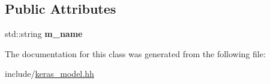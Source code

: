 \subsection*{Public Attributes}
\begin{DoxyCompactItemize}
\item 
\mbox{\label{classkeras_1_1_layer_a07d82395843bef44049586f33fd9e5a1}} 
std\+::string {\bfseries m\+\_\+name}
\end{DoxyCompactItemize}


The documentation for this class was generated from the following file\+:\begin{DoxyCompactItemize}
\item 
include/\mbox{\hyperlink{keras__model_8hh}{keras\+\_\+model.\+hh}}\end{DoxyCompactItemize}
